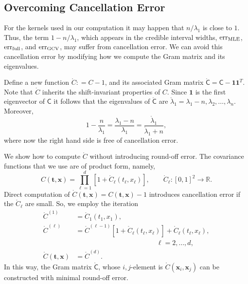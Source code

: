\documentclass[twocolumn]{svjour3}          %
\newcommand{\bm}[1]{\boldsymbol{#1}}
\newcommand{\reals}{\mathbb{R}}
\newcommand{\rC}{\mathring{C}}
\newcommand{\rlambda}{\mathring{\lambda}}
\newcommand{\vt}{\bm{t}}
\newcommand{\vx}{\bm{x}}
\newcommand{\vone}{\bm{1}}
\newcommand{\mC}{\mathsf{C}}
\newcommand{\rmC}{\mathring{\mathsf{C}}}
\newcommand{\MLE}{\textup{MLE}}
\newcommand{\err}{\textup{err}}
\begin{document}
\subsection{Overcoming Cancellation Error}
For the kernels used in our computation it may happen that $n/\lambda_1$ is close to $1$.  Thus, the term $1-n/\lambda_1$, which appears in the credible interval widths, $\err_{\MLE}$, $\err_{\textup{full}}$, and $\err_{\textup{GCV}}$, may suffer from cancellation error.  We can avoid this cancellation error by modifying how we compute the Gram matrix and its eigenvalues.

Define a new function $\rC : = C -1$, and its associated Gram matrix $\rmC = \mC - \vone \vone^T$.   Note that $\rC$ inherits the shift-invariant properties of $C$.  Since $\vone$ is the first eigenvector of $\mC$ it follows that the eigenvalues of $\rmC$ are $\rlambda_1 = \lambda_1 - n, \lambda_2, \ldots, \lambda_n$.  Moreover,
\begin{equation*}
1 - \frac{n}{\lambda_1}  = \frac{\lambda_1 - n}{\lambda_1} = \frac{\rlambda_1}{\rlambda_1 +n},
\end{equation*}
where now the right hand side is free of cancellation error.

We show how to compute $\rC$ without introducing round-off error.  The covariance functions that we use are of product form, namely,
\begin{equation*}
C(\vt, \vx) = \prod_{\ell=1}^d \left[1 + \rC_\ell(t_\ell,x_\ell) \right], \qquad  \rC_\ell:[0,1]^2 \to \reals.
\end{equation*}
Direct computation of $\rC (\vt,\vx) = C(\vt,\vx) -1$ introduces cancellation error if the $ \rC_\ell$ are small.  So, we employ the iteration
\begin{align*}
\rC^{(1)} &= \rC_1(t_1,x_1),  \\
\rC^{(\ell)} &  = \rC^{(\ell-1)}[1 + \rC_\ell(t_\ell,x_\ell)] + \rC_\ell(t_\ell,x_\ell), \\
& \hspace{5cm} \ell = 2, \ldots, d, \\
\rC(\vt,\vx)  & = \rC^{(d)}.
\end{align*}
In this way, the Gram matrix $\rmC$, whose $i,j$-element is $\rC(\vx_i,\vx_j)$ can be constructed with minimal round-off error.
\end{document}
